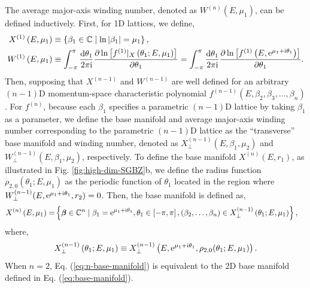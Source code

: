 The average major-axis winding number, denoted as $W^{(n)}(E,\mu_{1})$, can be
defined inductively. First, for 1D lattices, we define, 
\begin{align}
X^{(1)}\left(E,\mu_{1}\right) & \equiv\left\{ \beta_{1}\in\mathbb{C}\mid\ln\left|\beta_{1}\right|=\mu_{1}\right\} ,\\
W^{(1)}\left(E,\mu_{1}\right) & \equiv\int_{-\pi}^{\pi}\frac{\mathrm{d}\theta_{1}}{2\pi\mathrm{i}}\frac{\partial\ln\left[f^{(1)}|_{X}\left(\theta_{1};E,\mu_{1}\right)\right]}{\partial\theta_{1}}=\int_{-\pi}^{\pi}\frac{\mathrm{d}\theta_{1}}{2\pi\mathrm{i}}\frac{\partial\ln\left[f^{(1)}\left(E,\mathrm{e}^{\mu_{1}+\mathrm{i}\theta_{1}}\right)\right]}{\partial\theta_{1}}.
\end{align}
Then, supposing that $X^{(n-1)}$ and $W^{(n-1)}$ are well defined for an arbitrary $(n-1)$D momentum-space
characteristic polynomial $f^{(n-1)}(E,\beta_{2},\beta_{3},\dots,\beta_{n})$.
For $f^{(n)}$, because each $\beta_{1}$ specifies a parametric $(n-1)$D
lattice by taking $\beta_{1}$ as a parameter, we define the base
manifold and average major-axis winding number corresponding to the parametric
$(n-1)$D lattice as the ``transverse'' base manifold and
winding number, denoted as $X_{\perp}^{(n-1)}(E,\beta_{1},\mu_{2})$
and $W_{\perp}^{(n-1)}(E,\beta_{1},\mu_{2})$, respectively. To define
the base manifold $X^{(n)}(E,r_{1})$, as illustrated in Fig. \ref{fig:high-dim-SGBZ}b,
we define the radius function $\rho_{2,0}(\theta_{1};E,\mu_{1})$ as
the periodic function of $\theta_{1}$ located in the region where
$W_{\perp}^{(n-1)}(E,\mathrm{e}^{\mu_{1}+\mathrm{i}\theta_{1}},r_{2})=0$. Then,
the base manifold is defined as, 
\begin{align}
X^{(n)}\left(E,\mu_{1}\right)= & \left\{ \boldsymbol{\beta}\in\mathbb{C}^{n}\mid\beta_{1}=\mathrm{e}^{\mu_{1}+\mathrm{i}\theta_{1}},\theta_{1}\in\left[-\pi,\pi\right],(\beta_{2},\dots,\beta_{n})\in X_{\perp}^{(n-1)}\left(\theta_{1};E,\mu_{1}\right)\right\} ,\label{eq:n-base-manifold}
\end{align}
where, 
\begin{equation}
X_{\perp}^{(n-1)}\left(\theta_{1};E,\mu_{1}\right)\equiv X_{\perp}^{(n-1)}\left(E,\mathrm{e}^{\mu_{1}+\mathrm{i}\theta_{1}},\rho_{2,0}(\theta_{1};E,\mu_{1})\right).
\end{equation}
When $n=2$, Eq. (\ref{eq:n-base-manifold}) is equivalent to the
2D base manifold defined in Eq. (\ref{eq:base-manifold}).

